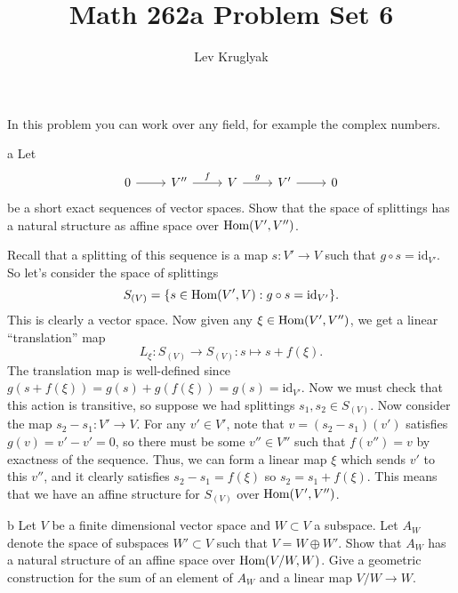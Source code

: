 \documentclass{pset}
\title{Math 262a Problem Set 6}
\author{Lev Kruglyak}
\begin{document}
\maketitle

\begin{problem}{1}
  In this problem you can work over any field, for example the complex numbers.
\end{problem}

\begin{parts}
  \begin{part}{a}
    Let 
    \[\begin{tikzcd}
	    0 & {V''} & V & {V'} & 0
	    \arrow[from=1-4, to=1-5]
	    \arrow["g",from=1-3, to=1-4]
	    \arrow["f",from=1-2, to=1-3]
	    \arrow[from=1-1, to=1-2]
    \end{tikzcd}\]
    be a short exact sequences of vector spaces. Show that the space of splittings has a natural structure as affine space over $\textrm{Hom}(V', V'')$.
  \end{part}

  Recall that a splitting of this sequence is a map $s : V' \to V$ such that $g\circ s = \textrm{id}_{V'}$. So let's consider the space of splittings
  \[
    S_{(V)} = \{ s \in \textrm{Hom}(V', V) : g\circ s = \textrm{id}_{V'}\}.
  \]
  This is clearly a vector space. Now given any $\xi \in \textrm{Hom}(V', V'')$, we get a linear ``translation'' map 
  \[
      L_\xi : S_{(V)} \to S_{(V)} : s \mapsto s+f(\xi).
  \]
  The translation map is well-defined since $g(s+f(\xi)) = g(s)+g(f(\xi)) = g(s)=\textrm{id}_{V'}$. Now we must check that this action is transitive, so suppose we had splittings $s_1, s_2\in S_{(V)}$. Now consider the map $s_2 - s_1 : V' \to V$. For any $v'\in V'$, note that $v=(s_2-s_1)(v')$ satisfies $g(v)=v'-v'=0$, so there must be some $v''\in V''$ such that $f(v'')=v$ by exactness of the sequence. Thus, we can form a linear map $\xi$ which sends $v'$ to this $v''$, and it clearly satisfies $s_2-s_1=f(\xi)$ so $s_2 = s_1+f(\xi)$.
  This means that we have an affine structure for $S_{(V)}$ over $\textrm{Hom}(V', V'')$.

  \begin{part}{b}
    Let $V$ be a finite dimensional vector space and $W\subset V$ a subspace. Let $A_W$ denote the space of subspaces $W'\subset V$ such that $V=W\oplus W'$. Show that $A_W$ has a natural structure of an affine space over $\textrm{Hom}(V/W, W)$. Give a geometric construction for the sum of an element of $A_W$ and a linear map $V/W \to W$.
  \end{part}


\end{parts}
\end{document}
